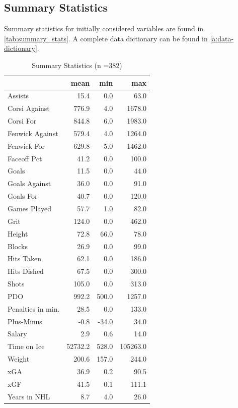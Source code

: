 \documentclass[10pt]{article}
\begin{document}
\subsection{Summary Statistics}
Summary statistics for initially considered variables are found in \autoref{tab:summary_stats}. A complete data dictionary can be found in \autoref{a:data-dictionary}. 
\begin{table}[ht]
\caption{\label{tab:summary_stats}Summary Statistics (n =382)}
\centering
\begin{tabular}[t]{lrrr}
\toprule
  & mean & min & max\\
\midrule
Assists & 15.4 & 0.0 & 63.0\\
Corsi Against & 776.9 & 4.0 & 1678.0\\
Corsi For & 844.8 & 6.0 & 1983.0\\
Fenwick Against & 579.4 & 4.0 & 1264.0\\
Fenwick For & 629.8 & 5.0 & 1462.0\\
Faceoff Pct & 41.2 & 0.0 & 100.0\\
Goals & 11.5 & 0.0 & 44.0\\
Goals Against & 36.0 & 0.0 & 91.0\\
Goals For & 40.7 & 0.0 & 120.0\\
Games Played & 57.7 & 1.0 & 82.0\\
Grit & 124.0 & 0.0 & 462.0\\
Height & 72.8 & 66.0 & 78.0\\
Blocks & 26.9 & 0.0 & 99.0\\
Hits Taken & 62.1 & 0.0 & 186.0\\
Hits Dished & 67.5 & 0.0 & 300.0\\
Shots & 105.0 & 0.0 & 313.0\\
PDO & 992.2 & 500.0 & 1257.0\\
Penalties in min. & 28.5 & 0.0 & 133.0\\
Plus-Minus & -0.8 & -34.0 & 34.0\\
Salary & 2.9 & 0.6 & 14.0\\
Time on Ice & 52732.2 & 528.0 & 105263.0\\
Weight & 200.6 & 157.0 & 244.0\\
xGA & 36.9 & 0.2 & 90.5\\
xGF & 41.5 & 0.1 & 111.1\\
Years in NHL & 8.7 & 4.0 & 26.0\\
\bottomrule
\end{tabular}
\end{table}
\end{document}
